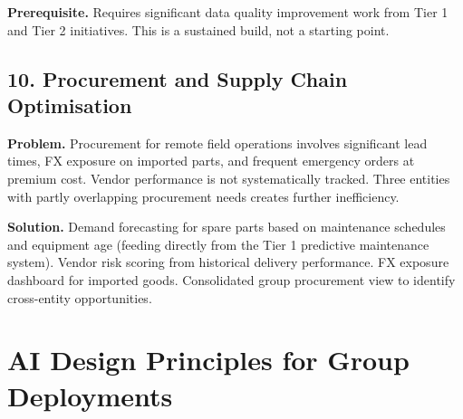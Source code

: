 \documentclass[10pt]{article}
\newcommand{\bigspacer}{\vspace{16pt}}
\begin{document}
\textbf{Prerequisite.}
Requires significant data quality improvement work from Tier 1 and Tier 2
initiatives. This is a sustained build, not a starting point.

\bigspacer

\subsection*{10. Procurement and Supply Chain Optimisation}

\textbf{Problem.}
Procurement for remote field operations involves significant lead times,
FX exposure on imported parts, and frequent emergency orders at premium cost.
Vendor performance is not systematically tracked. Three entities with partly
overlapping procurement needs creates further inefficiency.

\textbf{Solution.}
Demand forecasting for spare parts based on maintenance schedules and
equipment age (feeding directly from the Tier 1 predictive maintenance
system). Vendor risk scoring from historical delivery performance. FX
exposure dashboard for imported goods. Consolidated group procurement view
to identify cross-entity opportunities.

\bigspacer

\section{AI Design Principles for Group Deployments}
\end{document}

